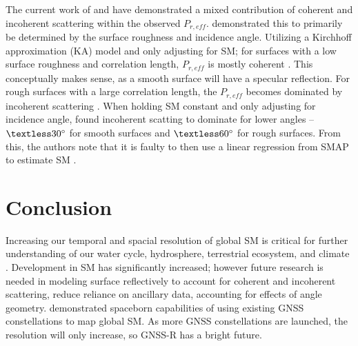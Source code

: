 \documentclass[11pt]{article}
\begin{document}
The current work of \textcite{Elevation_Angle_Impact} and \textcite{Semiempirical_Modeling} have demonstrated a mixed contribution of coherent and incoherent scattering within the observed $P_{r, eff}$. \citeauthor{Semiempirical_Modeling} demonstrated this to primarily be determined by the surface roughness and incidence angle. Utilizing a Kirchhoff approximation (KA) model and only adjusting for SM; for surfaces with a low surface roughness and correlation length, $P_{r, eff}$ is mostly coherent \cite{Semiempirical_Modeling}. This conceptually makes sense, as a smooth surface will have a specular reflection. For rough surfaces with a large correlation length, the $P_{r, eff}$ becomes dominated by incoherent scattering \cite{Semiempirical_Modeling}. When holding SM constant and only adjusting for incidence angle, \citeauthor{Semiempirical_Modeling} found incoherent scatting to dominate for lower angles -- $\textless 30\degree$ for smooth surfaces and $\textless 60\degree$ for rough surfaces. From this, the authors note that it is faulty to then use a linear regression from SMAP to estimate SM \cite{Semiempirical_Modeling}. 

\section{Conclusion}
Increasing our temporal and spacial resolution of global SM is critical for further understanding of our water cycle, hydrosphere, terrestrial ecosystem, and climate \cite{CYGNSS, GNSS_R_Spaceborn_Challenges}. Development in SM has significantly increased; however future research is needed in modeling surface reflectively to account for coherent and incoherent scattering, reduce reliance on ancillary data, accounting for effects of angle geometry. \citeauthor{CYGNSS} demonstrated spaceborn capabilities of using existing GNSS constellations to map global SM. As more GNSS constellations are launched, the resolution will only increase, so GNSS-R has a bright future.  

\clearpage
\printbibliography
\end{document}
